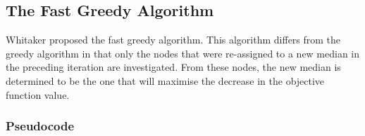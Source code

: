 \documentclass[11pt]{article}
\begin{document}
	
	\subsection{The Fast Greedy Algorithm}
	Whitaker \cite{WHIT83}  proposed the fast greedy algorithm.  This algorithm differs from the greedy algorithm in that only the nodes that were re-assigned to a new median in the preceding iteration are investigated.  From these nodes, the new median is determined to be the one that will maximise the decrease in the objective function value.
	
	\subsubsection{Pseudocode}
\end{document}
